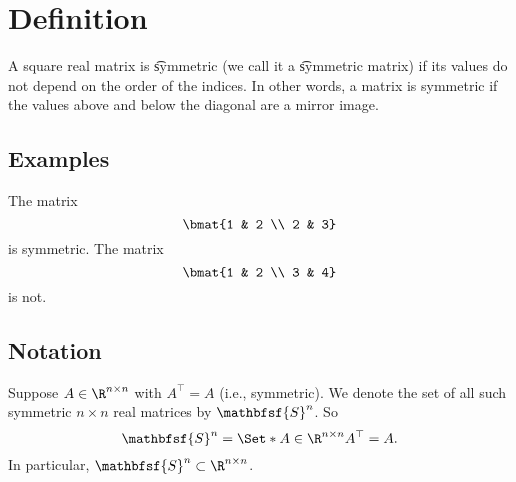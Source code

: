 
\section*{Definition}

A square real matrix is \t{symmetric} (we call it a \t{symmetric matrix}) if its values do not depend on the order of the indices.
In other words, a matrix is symmetric if the values above and below the diagonal are a mirror image.

\subsection*{Examples}

The matrix
\[
\bmat{1 & 2 \\ 2 & 3}
\]
is symmetric.
The matrix
\[
\bmat{1 & 2 \\ 3 & 4}
\]
is not.

\subsection*{Notation}

Suppose $A \in \R ^{n \times  n}$ with $A^\top  = A$ (i.e., symmetric).
We denote the set of all such symmetric $n \times  n$ real matrices by $\mathbfsf{S} ^n$.
So
\[
\mathbfsf{S} ^n = \Set*{A \in \R ^{n \times  n}}{A^\top  = A}.
\]
In particular, $\mathbfsf{S} ^n \subset \R ^{n \times  n}$.

\blankpage
